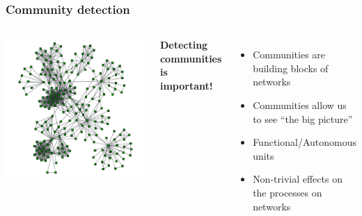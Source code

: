 \documentclass{beamer}
\begin{document}
\begin{frame}
    \frametitle{Community detection}
    \begin{columns}
        \includegraphics[width=\columnwidth, trim = 30 0 30 30, clip = true]{coauthors.pdf}

    \centering
    
    {\bf Detecting communities is important!}
    \vspace{2em}
    \begin{itemize}
    \setlength\itemsep{1em}
        \item{\small Communities are building blocks of networks}
        \item{\small Communities allow us to see ``the big picture''}
        \item{\small Functional/Autonomous units}
        \item{\small Non-trivial effects on the processes on networks}
    \end{itemize}
    \end{columns}
\end{frame}
\end{document}
